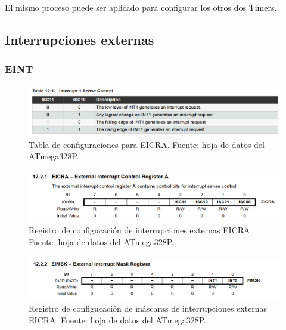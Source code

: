 El mismo proceso puede ser aplicado para configurar los otros dos Timers.

\subsection{Interrupciones externas}

    \subsubsection{EINT}

    \begin{figure}[H]
    \centering
    \includegraphics[width=\linewidth]{./Anexos/Marco Teorico/External Interrupts/EICRA table.png}
    \caption{Tabla de configuraciones para EICRA. Fuente: hoja de datos del ATmega328P\@\cite{atmega328p_datasheet}.}
    \label{fig:EICRA-table}
    \end{figure}

    \begin{figure}[H]
    \centering
    \includegraphics[width=\linewidth]{./Anexos/Marco Teorico/External Interrupts/EICRA.png}
    \caption{Registro de configucación de interrupciones externas EICRA. Fuente: hoja de datos del ATmega328P\@\cite{atmega328p_datasheet}.}
    \label{fig:EICRA}
    \end{figure}

    \begin{figure}[H]
    \centering
    \includegraphics[width=\linewidth]{./Anexos/Marco Teorico/External Interrupts/EIMSK.png}
    \caption{Registro de configucación de máscaras de interrupciones externas EICRA. Fuente: hoja de datos del ATmega328P\@\cite{atmega328p_datasheet}.}
    \label{fig:EIMSK}
    \end{figure}

